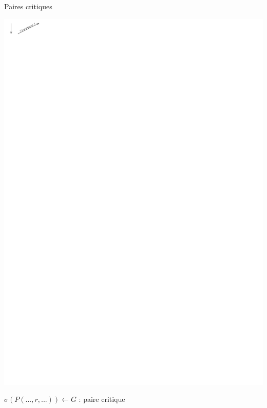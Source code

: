 \documentclass[xcolor={dvipsnames}]{beamer}
\begin{document}
\begin{frame}{Paires critiques}
\begin{overprint}
    \begin{center}
      \includegraphics[width=.8\linewidth]{media/CP2.pdf} \\
    \end{center}
  \end{overprint}
  $\sigma(P(..., r, ...)) \leftarrow G$ : paire critique
\end{frame}
\end{document}
